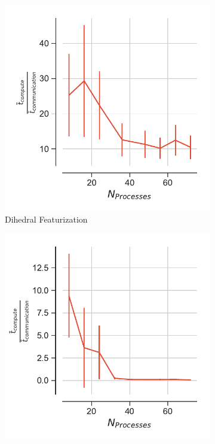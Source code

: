 \begin{figure}[ht!]
\centering
\begin{subfigure}{.4\textwidth}
  \includegraphics[width=\linewidth]{figures/tcomp_tcomm_ratio_dihed.pdf}
  \caption{Dihedral Featurization}
  \label{fig:tcomp_tcomm_ratio_dihed}
\end{subfigure}
\bigskip
\begin{subfigure} {.4\textwidth}
  \includegraphics[width=\linewidth]{figures/tcomp_tcomm_RMSD.pdf}

\end{subfigure}
\end{figure}
